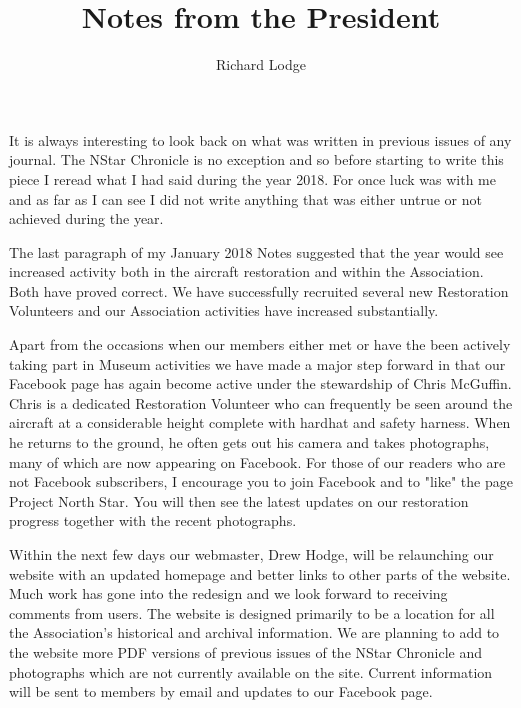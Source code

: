 
%


\title{Notes from the President}
\author{Richard Lodge}

\maketitle

It is always interesting to look back on what was written in previous issues of
any journal. The NStar Chronicle is no exception and so before starting to
write this piece I reread what I had said during the year 2018. For once luck
was with me and as far as I can see I did not write anything that was either
untrue or not achieved during the year.

The last paragraph of my January 2018 Notes suggested that the year would see
increased activity both in the aircraft restoration and within the Association.
Both have proved correct. We have successfully recruited several new
Restoration Volunteers and our Association activities have increased
substantially.

Apart from the occasions when our members either met or have the been actively
taking part in Museum activities we have made a major step forward in that our
Facebook page has again become active under the stewardship of Chris McGuffin.
Chris is a dedicated Restoration Volunteer who can frequently be seen around
the aircraft at a considerable height complete with hardhat and safety harness.
When he returns to the ground, he often gets out his camera and takes
photographs, many of which are now appearing on Facebook. For those of our
readers who are not Facebook subscribers, I encourage you to join Facebook and
to "like" the page Project North Star. You will then see the latest updates on
our restoration progress together with the recent photographs.

Within the next few days our webmaster, Drew Hodge, will be relaunching our
website with an updated homepage and better links to other parts of the
website. Much work has gone into the redesign and we look forward to receiving
comments from users. The website is designed primarily to be a location for all
the Association's historical and archival information. We are planning to add
to the website more PDF versions of previous issues of the NStar Chronicle and
photographs which are not currently available on the site. Current information
will be sent to members by email and updates to our Facebook page.

